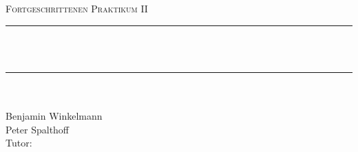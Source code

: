 \newcommand{\HRule}{\rule{\linewidth}{0.5mm}}
\begin{titlepage}
\begin{center}
  \textsc{\Large Fortgeschrittenen Praktikum II }\\[0.5cm]
  \HRule \\[0.4cm]
  { \huge \bfseries \exptitle}\\
  \HRule \\[0.5cm]
  \large \expdate\\[0.5cm]  
  Benjamin Winkelmann \\
  Peter Spalthoff \\
  \vspace{10pt}
  \large 
  Tutor: \exptutor \\[3cm]
  \vfill
  \normalsize
\end{center}
\end{titlepage}